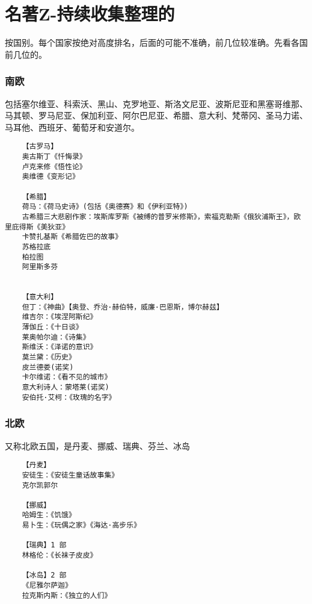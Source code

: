 \documentclass[UTF8]{../../RepresentationUniverse}
\begin{document}
\section{名著Z-持续收集整理的}

按国别。每个国家按绝对高度排名，后面的可能不准确，前几位较准确。先看各国前几位的。

\subsubsection{南欧}
包括塞尔维亚、科索沃、黑山、克罗地亚、斯洛文尼亚、波斯尼亚和黑塞哥维那、马其顿、罗马尼亚、保加利亚、阿尔巴尼亚、希腊、意大利、梵蒂冈、圣马力诺、马耳他、西班牙、葡萄牙和安道尔。
\begin{lstlisting}
    【古罗马】
    奥古斯丁《忏悔录》
    卢克来修《悟性论》
    奥维德《变形记》
    
    【希腊】
    荷马：《荷马史诗》(包括《奥德赛》和《伊利亚特》) 
    古希腊三大悲剧作家：埃斯库罗斯《被缚的普罗米修斯》，索福克勒斯《俄狄浦斯王》，欧里庇得斯《美狄亚》
    卡赞扎基斯《希腊佐巴的故事》
    苏格拉底
    柏拉图
    阿里斯多芬
    
    
    【意大利】
    但丁：《神曲》【奥登、乔治·赫伯特，威廉·巴恩斯，博尔赫兹】
    维吉尔：《埃涅阿斯纪》
    薄伽丘：《十日谈》
    莱奥帕尔迪：《诗集》
    斯维沃：《泽诺的意识》
    莫兰黛：《历史》
    皮兰德娄(诺奖) 
    卡尔维诺：《看不见的城市》
    意大利诗人：蒙塔莱(诺奖) 
    安伯托·艾柯：《玫瑰的名字》
\end{lstlisting}




\subsubsection{北欧}
又称北欧五国，是丹麦、挪威、瑞典、芬兰、冰岛
\begin{lstlisting}
    【丹麦】
    安徒生：《安徒生童话故事集》
    克尔凯郭尔

    【挪威】
    哈姆生：《饥饿》
    易卜生：《玩偶之家》《海达·高步乐》
    
    【瑞典】1 部
    林格伦：《长袜子皮皮》
    
    【冰岛】2 部
    《尼雅尔萨迦》
    拉克斯内斯：《独立的人们》
\end{lstlisting}
\end{document}
